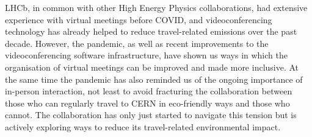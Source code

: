\documentclass[../SustainableHEP.tex]{subfiles}
\begin{document}
\begin{casestudy}
LHCb, in common with other High Energy Physics collaborations, had extensive experience with virtual meetings before COVID, and videoconferencing
technology has already helped to reduce travel-related emissions over the past decade.
However, the pandemic, as well as recent improvements to the videoconferencing software infrastructure, have shown us ways 
in which the organisation of virtual meetings can be improved and made more inclusive. 
At the same time the pandemic has also reminded us of the ongoing importance of in-person interaction,
not least to avoid fracturing the collaboration between those who can regularly travel to CERN in eco-friendly ways and those who cannot.
The collaboration has only just started to navigate this tension but is actively exploring ways to reduce its 
travel-related environmental impact.

\end{casestudy}
\end{document}
